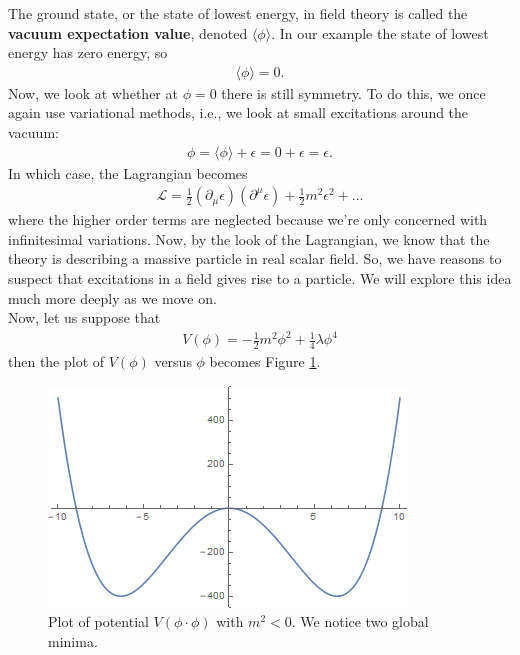 \documentclass[a4paper,11pt]{article}
\numberwithin{equation}{section}
\theoremstyle{definition}
\newcommand{\p}{\partial}
\newcommand{\lag}{\mathcal{L}}
\begin{document}
The ground state, or the state of lowest energy, in field theory is called the \textbf{vacuum expectation value}, denoted $\langle \phi \rangle$. In our example the state of lowest energy has zero energy, so
\begin{align}
\langle \phi \rangle  = 0.
\end{align}
Now, we look at whether at $\phi = 0$ there is still symmetry. To do this, we once again use variational methods, i.e., we look at small excitations around the vacuum:
\begin{align}
\phi = \langle \phi \rangle + \epsilon = 0+\epsilon = \epsilon.
\end{align}
In which case, the Lagrangian becomes
\begin{align}
\lag = \frac{1}{2}(\p_\mu\epsilon)(\p^\mu\epsilon) + \frac{1}{2}m^2\epsilon^2+\dots
\end{align}
where the higher order terms are neglected because we're only concerned with infinitesimal variations. Now, by the look of the Lagrangian, we know that the theory is describing a massive particle in real scalar field. So, we have reasons to suspect that excitations in a field gives rise to a particle. We will explore this idea much more deeply as we move on.\\

Now, let us suppose that 
\begin{align}
V(\phi) = -\frac{1}{2}m^2\phi^2 + \frac{1}{4}\lambda \phi^4
\end{align}
then the plot of $V(\phi)$ versus $\phi$ becomes Figure \ref{curve}.\\
\begin{figure}[h!]
	\centering
	\includegraphics[scale=1]{curve.png}
	\caption{Plot of potential $V(\phi\cdot \phi)$ with $m^2 < 0$. We notice two global minima.}
	\label{curve}
\end{figure}
\end{document}

